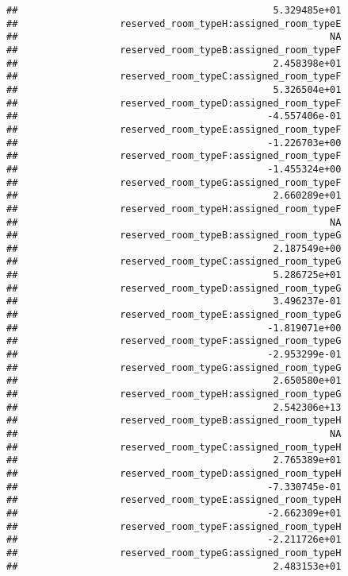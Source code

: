 \documentclass[
]{article}
\begin{document}
\begin{verbatim}
##                                             5.329485e+01 
##                  reserved_room_typeH:assigned_room_typeE 
##                                                       NA 
##                  reserved_room_typeB:assigned_room_typeF 
##                                             2.458398e+01 
##                  reserved_room_typeC:assigned_room_typeF 
##                                             5.326504e+01 
##                  reserved_room_typeD:assigned_room_typeF 
##                                            -4.557406e-01 
##                  reserved_room_typeE:assigned_room_typeF 
##                                            -1.226703e+00 
##                  reserved_room_typeF:assigned_room_typeF 
##                                            -1.455324e+00 
##                  reserved_room_typeG:assigned_room_typeF 
##                                             2.660289e+01 
##                  reserved_room_typeH:assigned_room_typeF 
##                                                       NA 
##                  reserved_room_typeB:assigned_room_typeG 
##                                             2.187549e+00 
##                  reserved_room_typeC:assigned_room_typeG 
##                                             5.286725e+01 
##                  reserved_room_typeD:assigned_room_typeG 
##                                             3.496237e-01 
##                  reserved_room_typeE:assigned_room_typeG 
##                                            -1.819071e+00 
##                  reserved_room_typeF:assigned_room_typeG 
##                                            -2.953299e-01 
##                  reserved_room_typeG:assigned_room_typeG 
##                                             2.650580e+01 
##                  reserved_room_typeH:assigned_room_typeG 
##                                             2.542306e+13 
##                  reserved_room_typeB:assigned_room_typeH 
##                                                       NA 
##                  reserved_room_typeC:assigned_room_typeH 
##                                             2.765389e+01 
##                  reserved_room_typeD:assigned_room_typeH 
##                                            -7.330745e-01 
##                  reserved_room_typeE:assigned_room_typeH 
##                                            -2.662309e+01 
##                  reserved_room_typeF:assigned_room_typeH 
##                                            -2.211726e+01 
##                  reserved_room_typeG:assigned_room_typeH 
##                                             2.483153e+01 

\end{verbatim}
\end{document}
